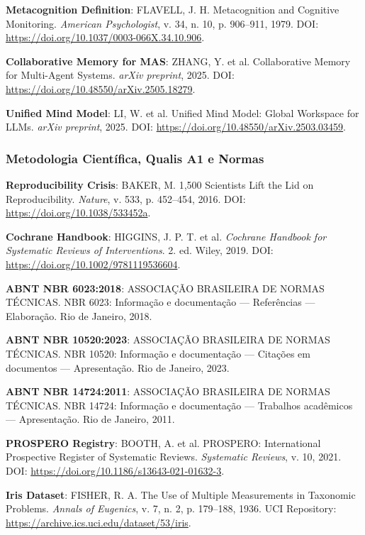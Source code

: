 \begin{enumerate}[leftmargin=*, label={[R\arabic*]}]
  \item \textbf{Metacognition Definition}: FLAVELL, J. H. Metacognition and Cognitive Monitoring. \textit{American Psychologist}, v. 34, n. 10, p. 906--911, 1979. DOI: \url{https://doi.org/10.1037/0003-066X.34.10.906}.

  \item \textbf{Collaborative Memory for MAS}: ZHANG, Y. et al. Collaborative Memory for Multi-Agent Systems. \textit{arXiv preprint}, 2025. DOI: \url{https://doi.org/10.48550/arXiv.2505.18279}.
  
  \item \textbf{Unified Mind Model}: LI, W. et al. Unified Mind Model: Global Workspace for LLMs. \textit{arXiv preprint}, 2025. DOI: \url{https://doi.org/10.48550/arXiv.2503.03459}.
\end{enumerate}

\subsubsection{Metodologia Científica, Qualis A1 e Normas}

\begin{enumerate}[leftmargin=*, label={[R\arabic*]}, resume]
  \item \textbf{Reproducibility Crisis}: BAKER, M. 1,500 Scientists Lift the Lid on Reproducibility. \textit{Nature}, v. 533, p. 452--454, 2016. DOI: \url{https://doi.org/10.1038/533452a}.
  
  \item \textbf{Cochrane Handbook}: HIGGINS, J. P. T. et al. \textit{Cochrane Handbook for Systematic Reviews of Interventions}. 2. ed. Wiley, 2019. DOI: \url{https://doi.org/10.1002/9781119536604}.
  
  \item \textbf{ABNT NBR 6023:2018}: ASSOCIAÇÃO BRASILEIRA DE NORMAS TÉCNICAS. NBR 6023: Informação e documentação — Referências — Elaboração. Rio de Janeiro, 2018.
  
  \item \textbf{ABNT NBR 10520:2023}: ASSOCIAÇÃO BRASILEIRA DE NORMAS TÉCNICAS. NBR 10520: Informação e documentação — Citações em documentos — Apresentação. Rio de Janeiro, 2023.
  
  \item \textbf{ABNT NBR 14724:2011}: ASSOCIAÇÃO BRASILEIRA DE NORMAS TÉCNICAS. NBR 14724: Informação e documentação — Trabalhos acadêmicos — Apresentação. Rio de Janeiro, 2011.
  
  \item \textbf{PROSPERO Registry}: BOOTH, A. et al. PROSPERO: International Prospective Register of Systematic Reviews. \textit{Systematic Reviews}, v. 10, 2021. DOI: \url{https://doi.org/10.1186/s13643-021-01632-3}.
  
  \item \textbf{Iris Dataset}: FISHER, R. A. The Use of Multiple Measurements in Taxonomic Problems. \textit{Annals of Eugenics}, v. 7, n. 2, p. 179--188, 1936. UCI Repository: \url{https://archive.ics.uci.edu/dataset/53/iris}.
\end{enumerate}

